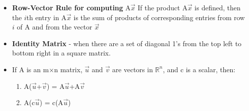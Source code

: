 \documentclass{report}
\newcommand{\Ax}{A$\vec{x}$}
\newcommand{\Vu}{$\vec{u}$}
\newcommand{\Vv}{$\vec{v}$}
\newcommand{\mxn}{m$\times$n}
\newcommand{\Rn}{$\mathbb{R}^n$}
\begin{document}
\begin{itemize}
		\item \textbf{Row-Vector Rule for computing }\Ax\newline
		If the product {\Ax} is defined, then the $i$th entry in {\Ax} is the sum of products of corresponding entries from row $i$ of A and from the vector $\vec{x}$
		\item \textbf{Identity Matrix} - when there are a set of diagonal 1's from the top left to bottom right in a square matrix.
		\item If A is an {\mxn} matrix, {\Vu} and {\Vv} are vectors in {\Rn}, and c is a scalar, then:
			\begin{enumerate}\addtolength{\leftskip}{4em}
				\item A(\Vu+\Vv) = A\Vu+A\Vv
				\item A(c\Vu) = c(A\Vu)
			\end{enumerate}
	\end{itemize}
	
\end{document}
